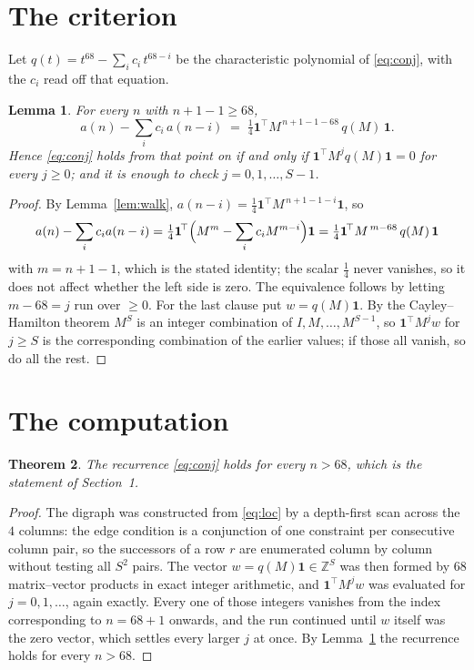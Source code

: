 \documentclass[11pt,a4paper]{article}
\theoremstyle{plain}
\newtheorem{theorem}{Theorem}
\newtheorem{lemma}[theorem]{Lemma}
\theoremstyle{definition}
\begin{document}
\section{The criterion}

Let $q(t)=t^{68}-\sum_i c_i\,t^{68-i}$ be the characteristic polynomial of
\eqref{eq:conj}, with the $c_i$ read off that equation.

\begin{lemma}\label{lem:crit}
For every $n$ with $n+1-1\ge68$,
\[
a(n)-\sum_i c_i\,a(n-i)\;=\;\tfrac1{4}\mathbf{1}^{\!\top}M^{\,n+1-1-68}\,q(M)\,\mathbf{1} .
\]
Hence \eqref{eq:conj} holds from that point on if and only if
$\mathbf{1}^{\!\top}M^{j}q(M)\mathbf{1}=0$ for every $j\ge0$; and it is enough to check
$j=0,1,\dots,S-1$.
\end{lemma}

\begin{proof}
By Lemma~\ref{lem:walk}, $a(n-i)=\tfrac1{4}\mathbf{1}^{\!\top}M^{\,n+1-1-i}\mathbf{1}$, so
\[
a(n)-\sum_i c_i a(n-i)
=\tfrac1{4}\mathbf{1}^{\!\top}\Bigl(M^{m}-\sum_i c_i M^{m-i}\Bigr)\mathbf{1}
=\tfrac1{4}\mathbf{1}^{\!\top}M^{\,m-68}\,q(M)\,\mathbf{1}
\]
with $m=n+1-1$, which is the stated identity; the scalar $\tfrac1{4}$ never vanishes, so
it does not affect whether the left side is zero. The equivalence follows by letting
$m-68=j$ run over $\ge0$. For the last clause put $w=q(M)\mathbf{1}$. By the
Cayley--Hamilton theorem $M^{S}$ is an integer combination of $I,M,\dots,M^{S-1}$, so
$\mathbf{1}^{\!\top}M^{j}w$ for $j\ge S$ is the corresponding combination of the earlier
values; if those all vanish, so do all the rest.
\end{proof}

\section{The computation}

\begin{theorem}
The recurrence \eqref{eq:conj} holds for every $n>68$, which is the statement of
Section~1.
\end{theorem}

\begin{proof}
The digraph was constructed from \eqref{eq:loc} by a depth-first scan across the $4$
columns: the edge condition is a conjunction of one constraint per consecutive column
pair, so the successors of a row $r$ are enumerated column by column without testing all
$S^2$ pairs. The vector $w=q(M)\mathbf{1}\in\mathbb{Z}^{S}$ was then formed by $68$
matrix--vector products in exact integer arithmetic, and $\mathbf{1}^{\!\top}M^{j}w$ was
evaluated for $j=0,1,\dots$, again exactly. Every one of those integers vanishes from the
index corresponding to $n=68+1$ onwards, and the run continued until $w$ itself was the
zero vector, which settles every larger $j$ at once. By Lemma~\ref{lem:crit} the recurrence
holds for every $n>68$.
\end{proof}
\end{document}
